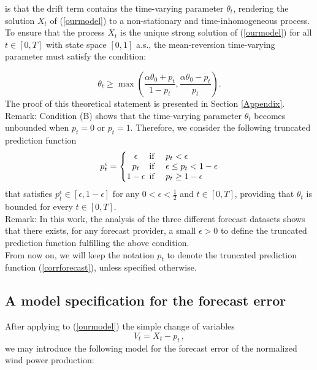 \documentclass[11pt]{article}
\theoremstyle{definition}
\begin{document}
is that the drift term contains the time-varying parameter $\theta_t$, rendering the solution $X_t$ of (\ref{ourmodel}) to a non-stationary and time-inhomogeneous process. To ensure that the process $X_t$ is the unique strong solution of (\ref{ourmodel}) for all $t \in [0,T]$ with state space $[0,1]$ a.s., the mean-reversion time-varying parameter must satisfy the condition:

\begin{equation}
\theta_t\geq \max\left(\frac{\alpha\theta_0+\dot p_t}{1-p_t},\frac{\alpha\theta_0-\dot p_t}{p_t}\right)\tag{B}. 
\end{equation} \label{condB}
The proof of this theoretical statement is presented in Section \ref{Appendix}. \\

Remark: Condition (B) shows that the time-varying parameter $\theta_t$ becomes unbounded when $p_t = 0$ or $p_t = 1$. Therefore, we consider the following truncated prediction function
\begin{equation}
  p_t^{\epsilon} = \left\{
  \begin{array}{@{}cl@{}}
    \epsilon \!\!\!&\text{if \quad} p_t  < \epsilon  \\
    p_t  \!\!\!&\text{if \quad}  \epsilon \leq p_t < 1 - \epsilon \\
    1 - \epsilon  \!\!\!&\text{if \quad}  p_t \geq 1 - \epsilon
 \end{array}\right.  \label{corrforecast}
\end{equation}
that satisfies $p_t^{\epsilon} \in [\epsilon, 1 - \epsilon]$ for any $0 < \epsilon < \frac{1}{2}$ and $t \in [0,T]$, providing that $\theta_t$ is bounded for every $t \in [0,T]$. \\

Remark: In this work, the analysis of the three different forecast datasets shows that there exists, for any forecast provider, a small $\epsilon >0$ to define the truncated prediction function fulfilling the above condition. \\

From now on, we will keep the notation $p_t$ to denote the truncated prediction function (\ref{corrforecast}), unless specified otherwise. 

\subsection{A model specification for the forecast error}
 After applying to (\ref{ourmodel}) the simple change of variables $$V_t = X_t - p_t \,,$$ we may introduce the following model for the forecast error of the normalized wind power production: 
\end{document}
